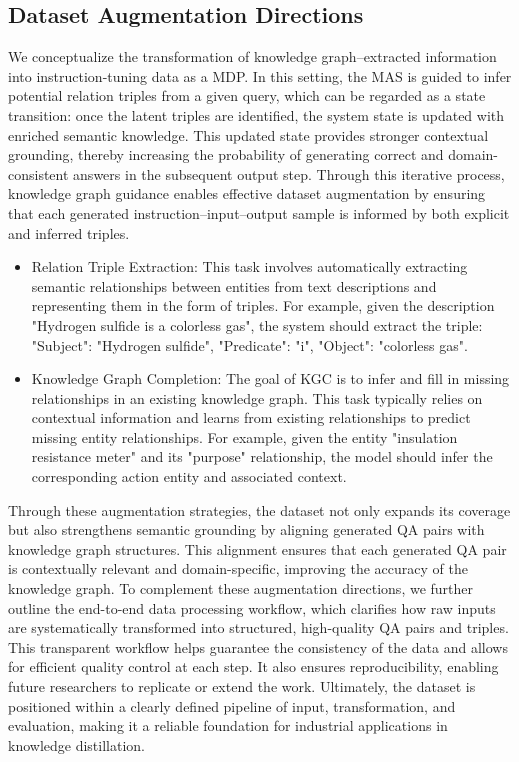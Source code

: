 \documentclass[preprint,12pt]{elsarticle}
\begin{document}
\subsection{Dataset Augmentation Directions}
\label{sec:3.3}
We conceptualize the transformation of knowledge graph–extracted information into instruction-tuning data as a MDP. In this setting, the MAS is guided to infer potential relation triples from a given query, which can be regarded as a state transition: once the latent triples are identified, the system state is updated with enriched semantic knowledge. This updated state provides stronger contextual grounding, thereby increasing the probability of generating correct and domain-consistent answers in the subsequent output step. Through this iterative process, knowledge graph guidance enables effective dataset augmentation by ensuring that each generated instruction–input–output sample is informed by both explicit and inferred triples.
\begin{itemize}
\item Relation Triple Extraction: This task involves automatically extracting semantic relationships between entities from text descriptions and representing them in the form of triples. For example, given the description "Hydrogen sulfide is a colorless gas", the system should extract the triple: "Subject":  "Hydrogen sulfide", "Predicate": "i", "Object":  "colorless gas".
\item Knowledge Graph Completion: The goal of KGC is to infer and fill in missing relationships in an existing knowledge graph. This task typically relies on contextual information and learns from existing relationships to predict missing entity relationships. For example, given the entity "insulation resistance meter" and its  "purpose" relationship, the model should infer the corresponding action entity and associated context.
\end{itemize}

Through these augmentation strategies, the dataset not only expands its coverage but also strengthens semantic grounding by aligning generated QA pairs with knowledge graph structures. This alignment ensures that each generated QA pair is contextually relevant and domain-specific, improving the accuracy of the knowledge graph. To complement these augmentation directions, we further outline the end-to-end data processing workflow, which clarifies how raw inputs are systematically transformed into structured, high-quality QA pairs and triples. This transparent workflow helps guarantee the consistency of the data and allows for efficient quality control at each step. It also ensures reproducibility, enabling future researchers to replicate or extend the work. Ultimately, the dataset is positioned within a clearly defined pipeline of input, transformation, and evaluation, making it a reliable foundation for industrial applications in knowledge distillation.
\end{document}
